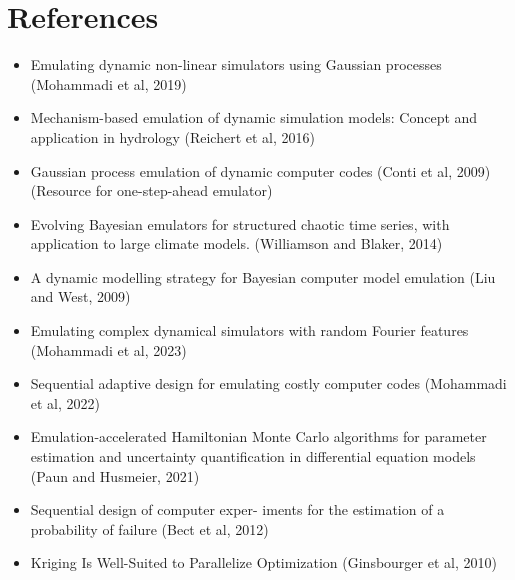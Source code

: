 \documentclass[12pt]{article}
\begin{document}
 



\section{References}
\begin{itemize}
\item Emulating dynamic non-linear simulators using Gaussian processes (Mohammadi et al, 2019)
\item Mechanism-based emulation of dynamic simulation models: Concept and application in hydrology (Reichert et al, 2016)
\item Gaussian process emulation of dynamic computer codes (Conti et al, 2009) (Resource for one-step-ahead emulator)
\item Evolving Bayesian emulators for structured chaotic time series, with application to large climate models. (Williamson and Blaker, 2014)
\item A dynamic modelling strategy for Bayesian computer model emulation (Liu and West, 2009)
\item Emulating complex dynamical simulators with random Fourier features (Mohammadi et al, 2023)
\item Sequential adaptive design for emulating costly computer codes (Mohammadi et al, 2022)
\item Emulation-accelerated Hamiltonian Monte Carlo algorithms for parameter estimation and uncertainty quantification in differential equation models (Paun and Husmeier, 2021)
\item Sequential design of computer exper- iments for the estimation of a probability of failure (Bect et al, 2012)
\item Kriging Is Well-Suited to Parallelize Optimization (Ginsbourger et al, 2010)
\end{itemize}
\end{document}
